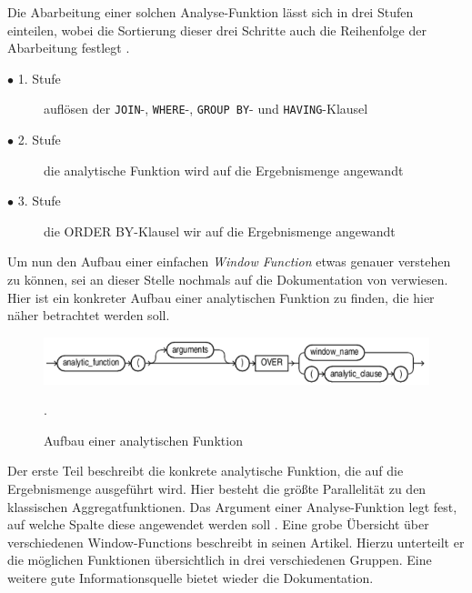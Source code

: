 Die Abarbeitung einer solchen Analyse-Funktion lässt sich in drei Stufen
einteilen, wobei die Sortierung dieser drei Schritte auch die Reihenfolge der Abarbeitung
festlegt \citep[vgl.][Seite 35]{Nuijten2023}.
\begin{description}
	\item[$\bullet$ 1. Stufe] auflösen der \texttt{JOIN}-, \texttt{WHERE}-, \texttt{GROUP
		BY}- und \texttt{HAVING}-Klausel \\ \citep[vgl.][Seite 35]{Nuijten2023}

	\item[$\bullet$ 2. Stufe] die analytische Funktion wird auf die Ergebnismenge angewandt
		\\ \citep[vgl.][Seite 35]{Nuijten2023}

	\item[$\bullet$ 3. Stufe] die ORDER BY-Klausel wir auf die Ergebnismenge angewandt
		\\ \citep[vgl.][Seite 35]{Nuijten2023}
\end{description}
Um nun den Aufbau einer einfachen \textit{Window Function} etwas genauer verstehen
zu können, sei an dieser Stelle nochmals auf die Dokumentation von \citet{oracle}
verwiesen. Hier ist ein konkreter Aufbau einer analytischen Funktion zu finden, die
hier näher betrachtet werden soll.
\begin{figure}[h]
	\centering
	\includegraphics[scale=0.5]{img/aufbauAnalyticFunction.jpg}
	\caption{ Aufbau einer analytischen Funktion \citep[vgl.][]{oracle}}
	. \label{fig:aufbauAnalyticFunction}
\end{figure}
Der erste Teil beschreibt die konkrete analytische Funktion, die auf die Ergebnismenge
ausgeführt wird. Hier besteht die größte Parallelität zu den klassischen
Aggregatfunktionen. Das Argument einer Analyse-Funktion legt fest, auf welche
Spalte diese angewendet werden soll \citep[vgl.][S.~110]{schicker2017datenbanken}.
Eine grobe Übersicht über verschiedenen Window-Functions beschreibt \citet[]{ibrahaim23}
in seinen Artikel. Hierzu unterteilt er die möglichen Funktionen übersichtlich
in drei verschiedenen Gruppen. Eine weitere gute Informationsquelle bietet wieder
die \citet{oracle} Dokumentation.

